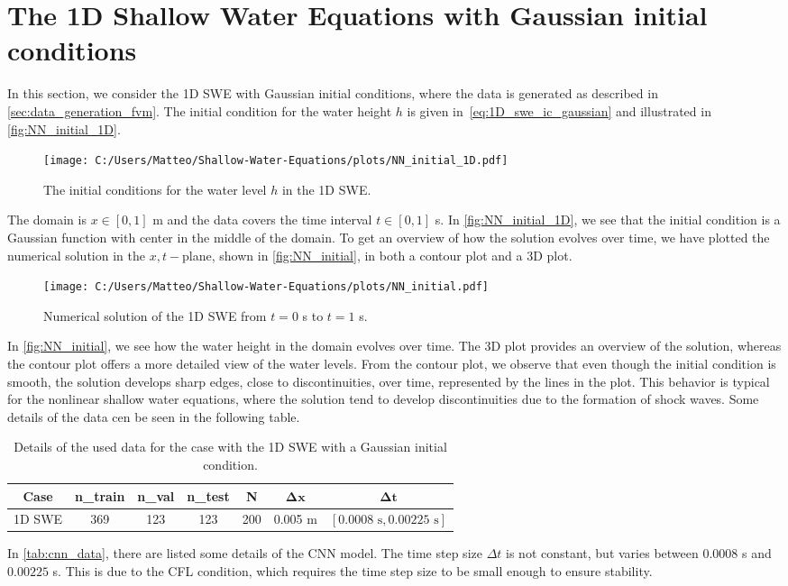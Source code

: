 \section{The 1D Shallow Water Equations with Gaussian initial conditions}\label{sec:data-driven-results-1D}
In this section, we consider the 1D SWE with Gaussian initial conditions, where the data is generated as described in \autoref{sec:data_generation_fvm}.
The initial condition for the water height $h$ is given in~\eqref{eq:1D_swe_ic_gaussian} and illustrated in \autoref{fig:NN_initial_1D}.
\begin{figure}[H]
    \centering
    \texttt{[image: C:/Users/Matteo/Shallow-Water-Equations/plots/NN\_initial\_1D.pdf]}
    \caption{The initial conditions for the water level $h$ in the 1D SWE.}\label{fig:NN_initial_1D}
\end{figure}
The domain is $ x \in [0, 1]$ m and the data covers the time interval $t \in [0, 1]$ s.
In \autoref{fig:NN_initial_1D}, we see that the initial condition is a Gaussian function with center in the middle of the domain.
To get an overview of how the solution evolves over time, we have plotted the numerical solution in the $x,t-$plane, shown in \autoref{fig:NN_initial}, in both a contour plot and a 3D plot.
\begin{figure}[H]
    \hspace{1.7cm} %
    \texttt{[image: C:/Users/Matteo/Shallow-Water-Equations/plots/NN\_initial.pdf]}
    \caption{Numerical solution of the 1D SWE from $t = 0$ s to $t = 1$ s.}\label{fig:NN_initial}
\end{figure}
In \autoref{fig:NN_initial}, we see how the water height in the domain evolves over time.
The 3D plot provides an overview of the solution, whereas the contour plot offers a more detailed view of the water levels.
From the contour plot, we observe that even though the initial condition is smooth, the solution develops sharp edges, close to discontinuities, over time, represented by the lines in the plot.
This behavior is typical for the nonlinear shallow water equations, where the solution tend to develop discontinuities due to the formation of shock waves.
Some details of the data cen be seen in the following table.
\begin{table}[H]
    \centering
    \begin{tabular}{c|cccccc}
        \textbf{Case} & \textbf{n\_train} & \textbf{n\_val} & \textbf{n\_test} & \textbf{N} & $\mathbf{\Delta x}$ & $\mathbf{\Delta t}$ \\
        \hline
        1D SWE & 369 & 123 & 123 & 200 & 0.005 m & $[0.0008 \text{ s}, 0.00225 \text{ s}]$ \\
    \end{tabular}
    \caption{Details of the used data for the case with the 1D SWE with a Gaussian initial condition.}\label{tab:cnn_data}
\end{table}
In \autoref{tab:cnn_data}, there are listed some details of the CNN model.
The time step size $\Delta t$ is not constant, but varies between $0.0008$ s and $0.00225$ s.
This is due to the CFL condition, which requires the time step size to be small enough to ensure stability.


